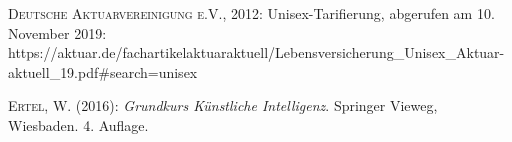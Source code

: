 \documentclass[a4paper,titlepage]{article}
\numberwithin{equation}{section} %
\begin{document}
\newpage


\begingroup
{}
\renewcommand*\refname{Literaturverzeichnis}

\begin{thebibliography}{----}

\textsc{Deutsche Aktuarvereinigung e.V.}, 2012: Unisex-Tarifierung, abgerufen am 10. November 2019: https://aktuar.de/fachartikelaktuaraktuell/Lebensversicherung{\_}Unisex{\_}Aktuar-aktuell{\_}19.pdf{\#}search=unisex

\textsc{Ertel}, W. (2016): {\it Grundkurs Künstliche Intelligenz}. Springer Vieweg, Wiesbaden. 4. Auflage.


\end{thebibliography}
\endgroup


\newpage
\end{document}
